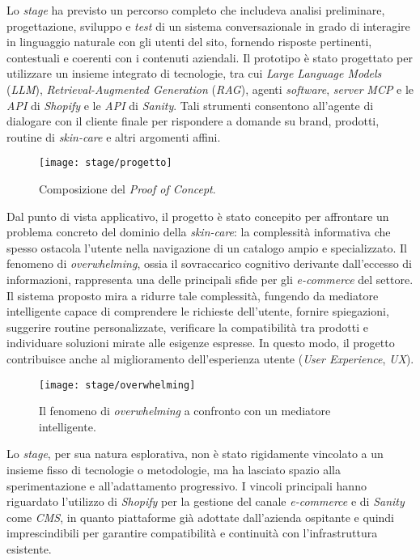 Lo \emph{stage} ha previsto un percorso completo che includeva analisi preliminare, progettazione, sviluppo e \emph{test} di un sistema conversazionale in grado di 
interagire in linguaggio naturale con gli utenti del sito, fornendo risposte pertinenti, contestuali e coerenti con i contenuti aziendali. 
Il prototipo è stato progettato per utilizzare un insieme integrato di tecnologie, tra cui \emph{Large Language Models} (\emph{LLM}), \emph{Retrieval-Augmented Generation} (\emph{RAG}), 
agenti \emph{software}, \emph{server} \emph{MCP} e le \emph{API} di \emph{Shopify} e le \emph{API} di \emph{Sanity}. 
Tali strumenti consentono all’agente di dialogare con il cliente finale per rispondere a domande su brand, prodotti, routine di \emph{skin-care} e altri argomenti affini.
\begin{figure}[htbp]
    \centering
    \texttt{[image: stage/progetto]}
    \caption{Composizione del \emph{Proof of Concept}.}
    \label{fig:progetto}
  \end{figure}
Dal punto di vista applicativo, il progetto è stato concepito per affrontare un problema concreto del dominio della \emph{skin-care}: la complessità informativa 
che spesso ostacola l’utente nella navigazione di un catalogo ampio e specializzato. 
Il fenomeno di \emph{overwhelming}, ossia il sovraccarico cognitivo derivante dall’eccesso di informazioni, rappresenta una delle principali sfide per gli \emph{e-commerce} del settore. 
Il sistema proposto mira a ridurre tale complessità, fungendo da mediatore intelligente capace di comprendere le richieste dell’utente, fornire spiegazioni, suggerire routine personalizzate, 
verificare la compatibilità tra prodotti e individuare soluzioni mirate alle esigenze espresse. 
In questo modo, il progetto contribuisce anche al miglioramento dell’esperienza utente (\emph{User Experience}, \emph{UX}).
\begin{figure}[htbp]
    \centering
    \texttt{[image: stage/overwhelming]}
    \caption{Il fenomeno di \emph{overwhelming} a confronto con un mediatore intelligente.}
    \label{fig:overwhelming}
  \end{figure}
Lo \emph{stage}, per sua natura esplorativa, non è stato rigidamente vincolato a un insieme fisso di tecnologie o metodologie, ma ha lasciato spazio alla 
sperimentazione e all’adattamento progressivo. 
I vincoli principali hanno riguardato l’utilizzo di \emph{Shopify} per la gestione del canale \emph{e-commerce} e di \emph{Sanity} 
come \emph{CMS}, in quanto piattaforme già adottate dall’azienda ospitante e quindi imprescindibili per garantire compatibilità e continuità con l’infrastruttura esistente.

